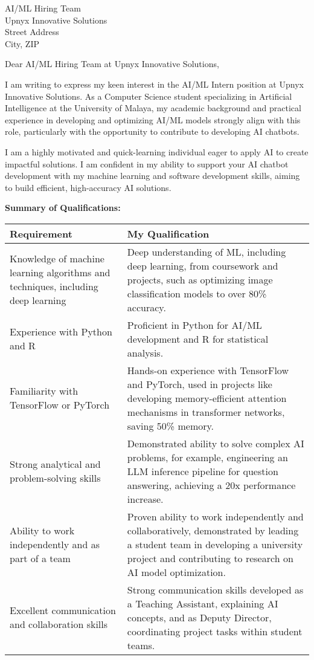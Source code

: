 \documentclass[10.5pt]{letter}
\date{\today}
\begin{document}
\begin{letter}{AI/ML Hiring Team\\Upnyx Innovative Solutions\\Street Address\\City, ZIP}

\opening{Dear AI/ML Hiring Team at Upnyx Innovative Solutions,}

I am writing to express my keen interest in the AI/ML Intern position at Upnyx Innovative Solutions. As a Computer Science student specializing in Artificial Intelligence at the University of Malaya, my academic background and practical experience in developing and optimizing AI/ML models strongly align with this role, particularly with the opportunity to contribute to developing AI chatbots.

I am a highly motivated and quick-learning individual eager to apply AI to create impactful solutions. I am confident in my ability to support your AI chatbot development with my machine learning and software development skills, aiming to build efficient, high-accuracy AI solutions.

\vspace{0.3cm}
\textbf{Summary of Qualifications:}
\vspace{0.2cm}

\renewcommand{\arraystretch}{1.3}
\begin{tabularx}{\textwidth}{@{}p{}X@{}}
\textbf{Requirement} & \textbf{My Qualification} \\
\hline
Knowledge of machine learning algorithms and techniques, including deep learning & Deep understanding of ML, including deep learning, from coursework and projects, such as optimizing image classification models to over 80\% accuracy. \\
Experience with Python and R & Proficient in Python for AI/ML development and R for statistical analysis. \\
Familiarity with TensorFlow or PyTorch & Hands-on experience with TensorFlow and PyTorch, used in projects like developing memory-efficient attention mechanisms in transformer networks, saving 50\% memory. \\
Strong analytical and problem-solving skills & Demonstrated ability to solve complex AI problems, for example, engineering an LLM inference pipeline for question answering, achieving a 20x performance increase. \\
Ability to work independently and as part of a team & Proven ability to work independently and collaboratively, demonstrated by leading a student team in developing a university project and contributing to research on AI model optimization. \\
Excellent communication and collaboration skills & Strong communication skills developed as a Teaching Assistant, explaining AI concepts, and as Deputy Director, coordinating project tasks within student teams. \\
\end{tabularx}


\end{letter}
\end{document}

